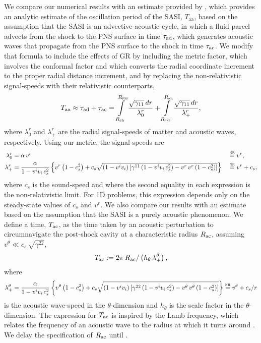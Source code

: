 We compare our numerical results with an estimate provided by
\citet{m2020}, which
provides an analytic estimate of the oscillation period
of the SASI, $T_{\mathrm{aa}}$,
based on the assumption that the SASI is an advective-acoustic cycle,
in which a fluid parcel advects from the shock to the PNS surface in time
$\tau_{\mathrm{ad}}$, which generates acoustic waves that propagate from the
PNS surface to the shock in time $\tau_{\mathrm{ac}}$.
We modify that formula to include the effects of GR
by including the metric factor, which involves the conformal factor
and which converts the radial coordinate increment to the proper radial
distance increment,
and by replacing the non-relativistic signal-speeds with their relativistic
counterparts,
\begin{equation}
  T_{\mathrm{aa}}\approx\tau_{\mathrm{ad}}+\tau_{\mathrm{ac}}
  =\int\limits_{R_{\mathrm{sh}}}^{R_{\textsc{pns}}}\frac{\sqrt{\gamma_{11}}\,dr}{\lambda^{r}_{0}}
  +\int\limits_{R_{\textsc{pns}}}^{R_{\mathrm{sh}}}\frac{\sqrt{\gamma_{11}}\,dr}{\lambda^{r}_{+}},
  \label{eq.AP.MullerEst}
\end{equation}
where $\lambda^{r}_{0}$ and $\lambda^{r}_{+}$ are the radial signal-speeds of
matter and acoustic waves, respectively.
Using our metric, the signal-speeds are \citep{rz2013}
\begin{alignat}{2}
  \lambda^{r}_{0}&=\alpha\,v^{r}&&\stackrel{\textsc{nr}}{=}v^{r},\label{eq.AP.lambda0}\\
  \lambda^{r}_{+}&=\frac{\alpha}{1-v^{i}v_{i}\,c_{s}^{2}}
  \left\{v^{r}\left(1-c_{s}^{2}\right)
  +c_{s}\sqrt{\left(1-v^{i}v_{i}\right)
  \left[\gamma^{11}\left(1-v^{i}v_{i}\,c_{s}^{2}\right)
  -v^{r}\,v^{r}\left(1-c_{s}^{2}\right)\right]}\right\}
  &&\stackrel{\textsc{nr}}{=}v^{r}+c_{s},\label{eq.AP.lambda+}
\end{alignat}
where $c_{s}$ is the sound-speed
and where the second equality in each expression is the non-relativistic limit.
For 1D problems,
this expression depends only on the steady-state values of $c_{s}$ and $v^{r}$.
We also compare our results with an estimate based on the assumption that
the SASI is a purely acoustic phenomenon.
We define a time, $T_{\mathrm{ac}}$, as the time taken by an
acoustic perturbation
to circumnavigate the post-shock cavity
at a characteristic radius $R_{\mathrm{ac}}$,
assuming $v^{\theta}\ll c_{s}\,\sqrt{\gamma^{22}}$,
\begin{equation}
  T_{\mathrm{ac}}
  :=2\pi\,R_{\mathrm{ac}}/\left(h_{\theta}\,\lambda_{+}^{\theta}\right),
  \label{eq.AP.Tac}
\end{equation}
where
\begin{equation}
  \lambda^{\theta}_{+}=\frac{\alpha}{1-v^{i}v_{i}\,c_{s}^{2}}
  \left\{v^{\theta}\left(1-c_{s}^{2}\right)
  +c_{s}\sqrt{\left(1-v^{i}v_{i}\right)
  \left[\gamma^{22}\left(1-v^{i}v_{i}\,c_{s}^{2}\right)
  -v^{\theta}\,v^{\theta}\left(1-c_{s}^{2}\right)\right]}\right\}
  \stackrel{\textsc{nr}}{=}v^{\theta}+c_{s}/r
\end{equation}
is the acoustic wave-speed in the $\theta$-dimension \citep{rz2013} and
$h_{\theta}$ is the scale factor in the $\theta$-dimension.
The expression for $T_{\mathrm{ac}}$ is inspired by the Lamb frequency,
which relates the frequency of an acoustic wave to the radius at which it turns
around \citep{hkt2004}.
We delay the specification of $R_{\mathrm{ac}}$ until .

